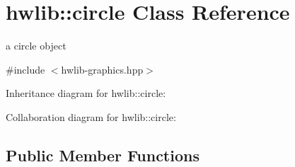 \hypertarget{classhwlib_1_1circle}{}\section{hwlib\+:\+:circle Class Reference}
\label{classhwlib_1_1circle}


a circle object  




{\ttfamily \#include $<$hwlib-\/graphics.\+hpp$>$}



Inheritance diagram for hwlib\+:\+:circle\+:


Collaboration diagram for hwlib\+:\+:circle\+:
\subsection*{Public Member Functions}
